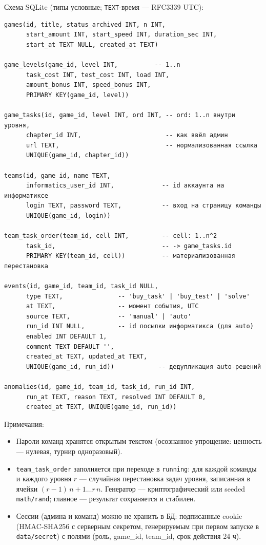 \documentclass[12pt,a4paper]{article}
\newcommand{\field}[1]{\texttt{#1}}
\begin{document}
Схема SQLite (типы условные; \field{TEXT}-время --- RFC3339 UTC):

\begin{small}\begin{verbatim}
games(id, title, status_archived INT, n INT,
      start_amount INT, start_speed INT, duration_sec INT,
      start_at TEXT NULL, created_at TEXT)

game_levels(game_id, level INT,          -- 1..n
      task_cost INT, test_cost INT, load INT,
      amount_bonus INT, speed_bonus INT,
      PRIMARY KEY(game_id, level))

game_tasks(id, game_id, level INT, ord INT, -- ord: 1..n внутри уровня,
      chapter_id INT,                       -- как ввёл админ
      url TEXT,                             -- нормализованная ссылка
      UNIQUE(game_id, chapter_id))

teams(id, game_id, name TEXT,
      informatics_user_id INT,             -- id аккаунта на информатиксе
      login TEXT, password TEXT,           -- вход на страницу команды
      UNIQUE(game_id, login))

team_task_order(team_id, cell INT,         -- cell: 1..n^2
      task_id,                             -- -> game_tasks.id
      PRIMARY KEY(team_id, cell))          -- материализованная перестановка

events(id, game_id, team_id, task_id NULL,
      type TEXT,               -- 'buy_task' | 'buy_test' | 'solve'
      at TEXT,                 -- момент события, UTC
      source TEXT,             -- 'manual' | 'auto'
      run_id INT NULL,         -- id посылки информатикса (для auto)
      enabled INT DEFAULT 1,
      comment TEXT DEFAULT '',
      created_at TEXT, updated_at TEXT,
      UNIQUE(game_id, run_id))            -- дедупликация auto-решений

anomalies(id, game_id, team_id, task_id, run_id INT,
      run_at TEXT, reason TEXT, resolved INT DEFAULT 0,
      created_at TEXT, UNIQUE(game_id, run_id))
\end{verbatim}\end{small}

Примечания:

\begin{itemize}[nosep]
  \item Пароли команд хранятся открытым текстом (осознанное упрощение:
        ценность --- нулевая, турнир одноразовый).
  \item \field{team\_task\_order} заполняется при переходе в \field{running}:
        для каждой команды и каждого уровня $r$ --- случайная перестановка
        задач уровня, записанная в ячейки $(r-1)\,n+1 \dots r\,n$.
        Генератор --- криптографический или seeded \field{math/rand};
        главное --- результат сохраняется и стабилен.
  \item Сессии (админа и команд) можно не хранить в БД: подписанные
        cookie (HMAC-SHA256 с серверным секретом, генерируемым при первом
        запуске в \field{data/secret}) с полями (роль, game\_id, team\_id,
        срок действия 24 ч).
\end{itemize}
\end{document}
